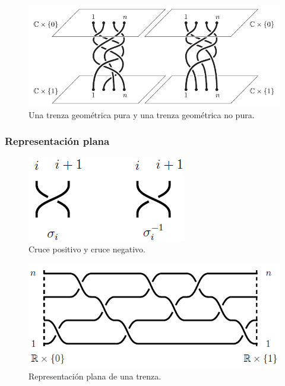 \documentclass{beamer}
\theoremstyle{definition}
\begin{document}
\begin{frame}
\begin{figure}[h!]
\includegraphics[scale=0.5]{Imagenes/hilos}
\caption{Una trenza geométrica pura y una trenza geométrica no pura.}
\end{figure}
\end{frame}

\begin{frame}
\frametitle{Representación plana}
\begin{figure}[h!]
\includegraphics[scale=0.6]{Imagenes/Diapcruce}
\caption{Cruce positivo y cruce negativo.}
\end{figure}
\end{frame}

\begin{frame}
\begin{figure}[h!]
\includegraphics[scale=0.6]{Imagenes/Diapplana}
\caption{Representación plana de una trenza.}
\end{figure}
\end{frame}
\end{document}
